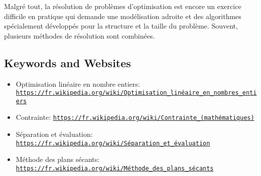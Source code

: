 \documentclass[a4paper,11pt]{report}
\newcommand{\BrochureUrlText}[1]{\texttt{#1}}
\begin{document}
Malgré tout, la résolution de problèmes d’optimisation est encore un exercice difficile en pratique qui demande une modélisation adroite et des algorithmes spécialement développés pour la structure et la taille du problème. Souvent, plusieurs méthodes de résolution sont combinées.

{\raggedright

\subsection*{Keywords and Websites}

\begin{itemize}
  \item Optimisation linéaire en nombre entiers: \href{https://fr.wikipedia.org/wiki/Optimisation_lin\%C3\%A9aire_en_nombres_entiers}{\BrochureUrlText{https://fr.wikipedia.org/wiki/Optimisation\_linéaire\_en\_nombres\_entiers}}
  \item Contrainte: \href{https://fr.wikipedia.org/wiki/Contrainte_(math\%C3\%A9matiques)}{\BrochureUrlText{https://fr.wikipedia.org/wiki/Contrainte\_(mathématiques)}}
  \item Séparation et évaluation: \href{https://fr.wikipedia.org/wiki/S\%C3\%A9paration_et_\%C3\%A9valuation}{\BrochureUrlText{https://fr.wikipedia.org/wiki/Séparation\_et\_évaluation}}
  \item Méthode des plans sécants: \href{https://fr.wikipedia.org/wiki/M\%C3\%A9thode_des_plans_s\%C3\%A9cants}{\BrochureUrlText{https://fr.wikipedia.org/wiki/Méthode\_des\_plans\_sécants}}
\end{itemize}


}
\end{document}
